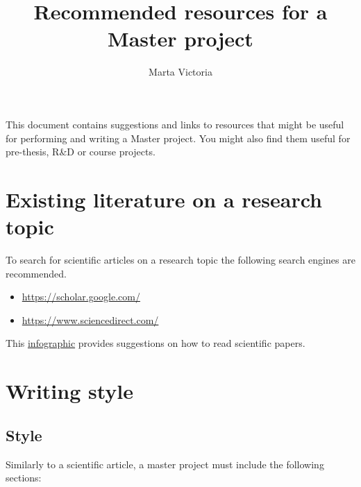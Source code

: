 \documentclass[3p]{elsarticle} %
\begin{document}
\begin{frontmatter}
\title{Recommended resources for a Master project}

\author[mymainaddress]{Marta Victoria}
\address[mymainaddress]{\href{mvp@eng.au.dk}{mvp@eng.au.dk}, Department of Engineering, Aarhus University, Inge Lehmanns Gade 10, 8000 Aarhus, Denmark}





\end{frontmatter}


This document contains suggestions and links to resources that might be useful for performing and writing a Master project. 
You might also find them useful for pre-thesis, R\&D or course projects.

\section{Existing literature on a research topic}

To search for scientific articles on a research topic the following search engines are recommended.

\begin{itemize}
\item \href{https://scholar.google.com/}{https://scholar.google.com/}
\item \href{https://www.sciencedirect.com/}{https://www.sciencedirect.com/}
\end{itemize}

This \href{https://www.elsevier.com/connect/infographic-how-to-read-a-scientific-paper}{infographic} provides suggestions on how to read scientific papers. 

\section{Writing style}

\subsection{Style}
Similarly to a scientific article, a master project must include the following sections:
\end{document}
